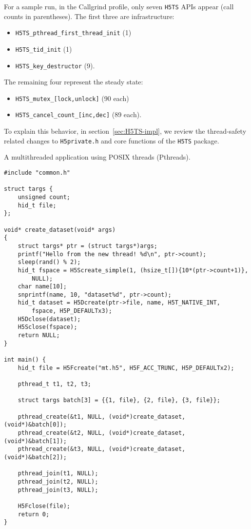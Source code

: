 For a sample run, in the Callgrind profile, only seven \texttt{H5TS} APIs appear (call counts in parentheses). The first three are infrastructure:
\begin{itemize}
    \item \texttt{H5TS\_pthread\_first\_thread\_init} (1)
    \item \texttt{H5TS\_tid\_init} (1)
    \item \texttt{H5TS\_key\_destructor} (9).
\end{itemize}
The remaining four represent the steady state:
\begin{itemize}
    \item \texttt{H5TS\_mutex\_[lock,unlock]} (90 each)
    \item \texttt{H5TS\_cancel\_count\_[inc,dec]} (89 each).
\end{itemize}

To explain this behavior, in section~\ref{sec:H5TS-impl}, we review the thread-safety related changes to \texttt{H5private.h} and core functions of the \texttt{H5TS} package.

\begin{listing}
\centering
\caption{A multithreaded application using POSIX threads (Pthreads).}
\label{lst:pthreads-ex-parallel}
\begin{verbatim}
#include "common.h"

struct targs {
    unsigned count;
    hid_t file;
};

void* create_dataset(void* args)
{
    struct targs* ptr = (struct targs*)args;
    printf("Hello from the new thread! %d\n", ptr->count);
    sleep(rand() % 2);
    hid_t fspace = H5Screate_simple(1, (hsize_t[]){10*(ptr->count+1)},
        NULL);
    char name[10];
    snprintf(name, 10, "dataset%d", ptr->count);
    hid_t dataset = H5Dcreate(ptr->file, name, H5T_NATIVE_INT,
        fspace, H5P_DEFAULTx3);
    H5Dclose(dataset);
    H5Sclose(fspace);
    return NULL;
}

int main() {
    hid_t file = H5Fcreate("mt.h5", H5F_ACC_TRUNC, H5P_DEFAULTx2);

    pthread_t t1, t2, t3;

    struct targs batch[3] = {{1, file}, {2, file}, {3, file}};

    pthread_create(&t1, NULL, (void*)create_dataset, (void*)&batch[0]);
    pthread_create(&t2, NULL, (void*)create_dataset, (void*)&batch[1]);
    pthread_create(&t3, NULL, (void*)create_dataset, (void*)&batch[2]);

    pthread_join(t1, NULL);
    pthread_join(t2, NULL);
    pthread_join(t3, NULL);

    H5Fclose(file);
    return 0;
}
\end{verbatim}
\end{listing}

